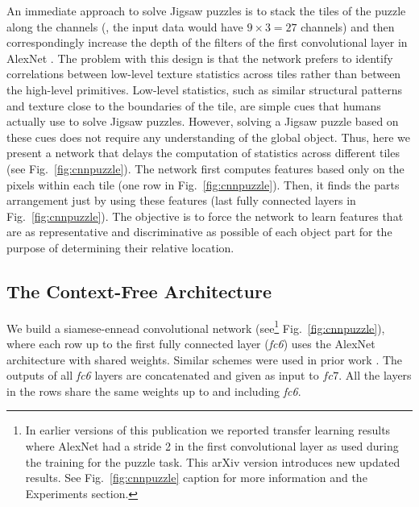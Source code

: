 \documentclass[runningheads]{llncs}
\begin{document}
An immediate approach to solve Jigsaw puzzles is to stack the tiles of the puzzle along the channels (\ie, the input data would have $9\times 3 = 27$ channels) and then correspondingly increase the depth of the filters of the first convolutional layer in AlexNet \cite{KrizhevskyIH12}. The problem with this design is that the network prefers to identify correlations between low-level texture statistics across tiles rather than between the high-level primitives. Low-level statistics, such as similar structural patterns and texture close to the boundaries of the tile, are simple cues that humans actually use to solve Jigsaw puzzles. However, solving a Jigsaw puzzle based on these cues does not require any understanding of the global object. Thus, here we present a network that delays the computation of statistics across different tiles (see Fig.~\ref{fig:cnnpuzzle}). The network first computes features based only on the pixels within each tile (one row in Fig.~\ref{fig:cnnpuzzle}). Then, it finds the parts arrangement just by using these features (last fully connected layers in Fig.~\ref{fig:cnnpuzzle}). The objective is to force the network to learn features that are as representative and discriminative as possible of each object part for the purpose of determining their relative location. 


\subsection{The Context-Free Architecture}

We build a siamese-ennead convolutional network (see\footnote{In earlier versions of this publication we reported transfer learning results where AlexNet had a stride 2 in the first convolutional layer as used during the training for the puzzle task. This arXiv version introduces new updated results. See Fig.~\ref{fig:cnnpuzzle} caption for more information and the Experiments section.} Fig.~\ref{fig:cnnpuzzle}), where each row up to the first fully connected layer (\emph{fc6}) uses the AlexNet architecture \cite{KrizhevskyIH12} with shared weights. Similar schemes were used in prior work \cite{Carl2015,Gupta15,agrawalCM15}. The outputs of all \emph{fc6} layers are concatenated and given as input to $fc7$. All the layers in the rows share the same weights up to and including \emph{fc6}.
\end{document}
